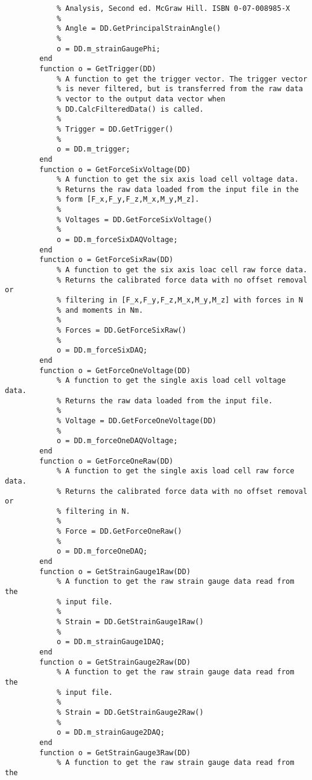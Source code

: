 \begin{lstlisting}
            % Analysis, Second ed. McGraw Hill. ISBN 0-07-008985-X
            %
            % Angle = DD.GetPrincipalStrainAngle()
            %
            o = DD.m_strainGaugePhi;
        end
        function o = GetTrigger(DD)
            % A function to get the trigger vector. The trigger vector
            % is never filtered, but is transferred from the raw data
            % vector to the output data vector when 
            % DD.CalcFilteredData() is called.
            %
            % Trigger = DD.GetTrigger()
            %
            o = DD.m_trigger;
        end
        function o = GetForceSixVoltage(DD)
            % A function to get the six axis load cell voltage data.
            % Returns the raw data loaded from the input file in the
            % form [F_x,F_y,F_z,M_x,M_y,M_z].
            %
            % Voltages = DD.GetForceSixVoltage()
            %
            o = DD.m_forceSixDAQVoltage;
        end
        function o = GetForceSixRaw(DD)
            % A function to get the six axis loac cell raw force data.
            % Returns the calibrated force data with no offset removal or
            % filtering in [F_x,F_y,F_z,M_x,M_y,M_z] with forces in N
            % and moments in Nm.
            %
            % Forces = DD.GetForceSixRaw()
            %
            o = DD.m_forceSixDAQ;
        end
        function o = GetForceOneVoltage(DD)
            % A function to get the single axis load cell voltage data.
            % Returns the raw data loaded from the input file.
            %
            % Voltage = DD.GetForceOneVoltage(DD)
            %
            o = DD.m_forceOneDAQVoltage;
        end
        function o = GetForceOneRaw(DD)
            % A function to get the single axis load cell raw force data.
            % Returns the calibrated force data with no offset removal or
            % filtering in N.
            %
            % Force = DD.GetForceOneRaw()
            %
            o = DD.m_forceOneDAQ;
        end
        function o = GetStrainGauge1Raw(DD)
            % A function to get the raw strain gauge data read from the
            % input file.
            %
            % Strain = DD.GetStrainGauge1Raw()
            %
            o = DD.m_strainGauge1DAQ;
        end
        function o = GetStrainGauge2Raw(DD)
            % A function to get the raw strain gauge data read from the
            % input file.
            %
            % Strain = DD.GetStrainGauge2Raw()
            %
            o = DD.m_strainGauge2DAQ;
        end
        function o = GetStrainGauge3Raw(DD)
            % A function to get the raw strain gauge data read from the

\end{lstlisting}
